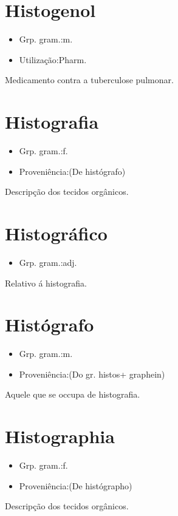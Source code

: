 \documentclass{article}
\begin{document}
\section{Histogenol}
\begin{itemize}
\item {Grp. gram.:m.}
\end{itemize}
\begin{itemize}
\item {Utilização:Pharm.}
\end{itemize}
Medicamento contra a tuberculose pulmonar.
\section{Histografia}
\begin{itemize}
\item {Grp. gram.:f.}
\end{itemize}
\begin{itemize}
\item {Proveniência:(De \textunderscore histógrafo\textunderscore )}
\end{itemize}
Descripção dos tecidos orgânicos.
\section{Histográfico}
\begin{itemize}
\item {Grp. gram.:adj.}
\end{itemize}
Relativo á histografia.
\section{Histógrafo}
\begin{itemize}
\item {Grp. gram.:m.}
\end{itemize}
\begin{itemize}
\item {Proveniência:(Do gr. \textunderscore histos\textunderscore  + \textunderscore graphein\textunderscore )}
\end{itemize}
Aquele que se occupa de histografia.
\section{Histographia}
\begin{itemize}
\item {Grp. gram.:f.}
\end{itemize}
\begin{itemize}
\item {Proveniência:(De \textunderscore histógrapho\textunderscore )}
\end{itemize}
Descripção dos tecidos orgânicos.
\end{document}
